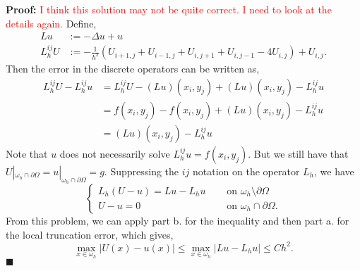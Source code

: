 \documentclass[11pt]{article}
\begin{document}
\textbf{Proof:} \textcolor{red}{I think this solution may not be quite correct.
I need to look at the details again.}
Define,
\begin{align*}
    Lu &:= -\Delta u + u \\
	L_h^{ij}U &:= -\frac{1}{h^2}( U_{i+1,j} + U_{i-1,j} + U_{i,j+1} + U_{i,j-1} - 4 U_{i,j} ) + U_{i,j}.
\end{align*}
Then the error in the discrete operators can be written as,
\begin{align*}
	L_h^{ij} U - L_h^{ij}u &= L_h^{ij}U - (Lu)(x_i,y_j) + (Lu)(x_i,y_j) - L_h^{ij}u \\
	&= f(x_i,y_j) - f(x_i,y_j) + (Lu)(x_i,y_j) - L_h^{ij} u \\
	&= (Lu)(x_i,y_j) - L_h^{ij} u
\end{align*}
Note that $u$ does not necessarily solve $L_h^{ij} u = f(x_i,y_j)$.
But we still have that $U|_{\omega_h\cap\partial\Omega} = u|_{\omega_h\cap\partial\Omega} = g$.
Suppressing the $ij$ notation on the operator $L_h$, we have
\begin{equation*}
\begin{cases}
    L_h(U - u) = Lu - L_h u &\quad \text{ on } \omega_h \setminus \partial \Omega \\
    U - u = 0 &\quad \text{ on } \omega_h \cap \partial \Omega.
\end{cases}
\end{equation*}
From this problem, we can apply part b. for the inequality and then part a. for the local truncation error, which gives,
\begin{equation*}
    \max_{x \in \omega_h} |U(x) - u(x)| \leq \max_{x\in\omega_h} |Lu - L_h u| \leq Ch^2.
\end{equation*}
$\blacksquare$

\vskip 2cm
\end{document}
